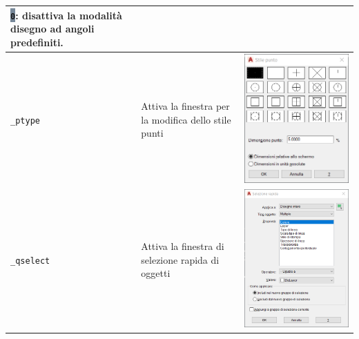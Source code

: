 \documentclass[..]{../IEEEphot}
\newcommand{\param}[1]{\colorbox{LightSlateGray}{\color{Navy}\texttt{\textbf{#1}}}}
\begin{document}
\begin{center}
\begin{longtable}{m{.2\linewidth}m{.33\linewidth}m{.33\linewidth}}
\param{0}: disattiva la modalità disegno ad angoli predefiniti.
\\
\midrule
\texttt{\_ptype} & Attiva la finestra per la modifica dello stile punti  & \includegraphics[width = 0.8\linewidth, keepaspectratio]{../images/png/_ptype.png} 
\\
\midrule
\texttt{\_qselect} & Attiva la finestra di selezione rapida di oggetti & \includegraphics[width = 0.8\linewidth, keepaspectratio]{../images/png/_qselect.png} 

\end{longtable}
\end{center}
\end{document}
